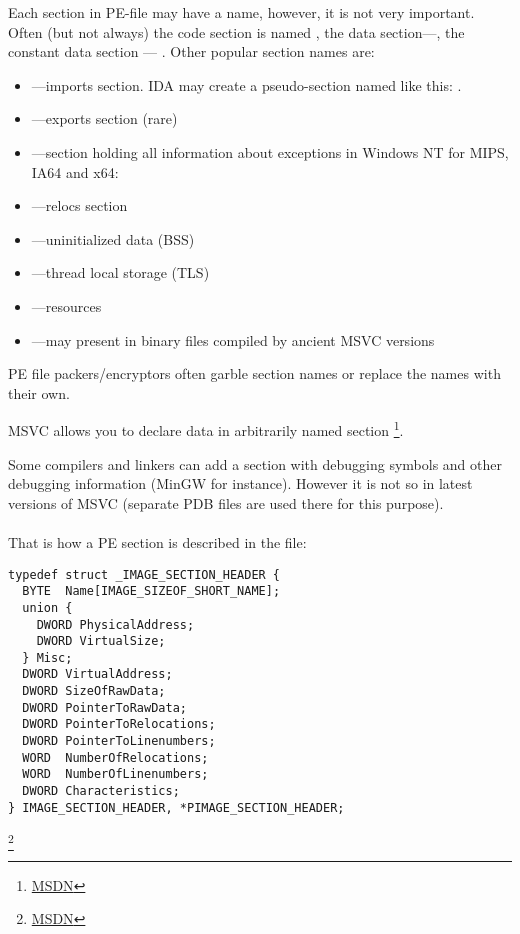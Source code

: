 Each section in PE-file may have a name, however, it is not very important.
Often (but not always) the code section is named , 
the data section---, the constant data section ---  .
Other popular section names are: 

\begin{itemize}
\item {}---imports section.
\ac{IDA} may create a pseudo-section named like this: .
\item {}---exports section (rare)
\item {}---section holding all information about exceptions in Windows NT for MIPS, \ac{IA64} and x64: 
\item {}---relocs section
\item {}---uninitialized data (\ac{BSS})
\item {}---thread local storage (\ac{TLS})
\item {}---resources
\item {}---may present in binary files compiled by ancient MSVC versions
\end{itemize}

PE file packers/encryptors often garble section names or replace the names with their own.

\ac{MSVC} allows you to declare data in arbitrarily named section
\footnote{\href{http://go.yurichev.com/17047}{MSDN}}.

Some compilers and linkers can add a section with debugging symbols and 
other debugging information (MinGW for instance).
However it is not so in latest versions of \ac{MSVC} (separate \gls{PDB} files are used there for this purpose).\\
\\
That is how a PE section is described in the file:

\begin{lstlisting}
typedef struct _IMAGE_SECTION_HEADER {
  BYTE  Name[IMAGE_SIZEOF_SHORT_NAME];
  union {
    DWORD PhysicalAddress;
    DWORD VirtualSize;
  } Misc;
  DWORD VirtualAddress;
  DWORD SizeOfRawData;
  DWORD PointerToRawData;
  DWORD PointerToRelocations;
  DWORD PointerToLinenumbers;
  WORD  NumberOfRelocations;
  WORD  NumberOfLinenumbers;
  DWORD Characteristics;
} IMAGE_SECTION_HEADER, *PIMAGE_SECTION_HEADER;
\end{lstlisting}
\footnote{\href{http://go.yurichev.com/17048}{MSDN}}

